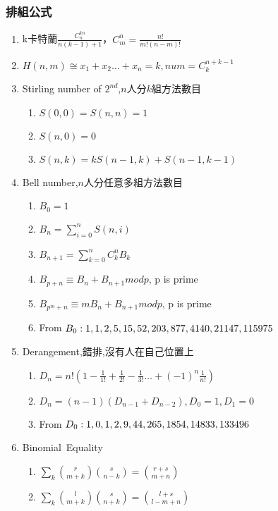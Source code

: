 \subsubsection{排組公式}
\begin{enumerate}
\itemsep = -3pt
\item k卡特蘭$\frac{C_{n}^{kn}}{n(k-1)+1}$，$C_{m}^{n}=\frac{n!}{m!(n-m)!}$
\item $H(n,m)\cong x_1+x_2\ldots +x_n=k, num=C_{k}^{n+k-1}$
\item Stirling number of $2^{nd}$,$n$人分$k$組方法數目
	\begin{enumerate}\itemsep = -2pt
		\item $S(0,0)=S(n,n)=1$
		\item $S(n,0)=0$
		\item $S(n,k)=kS(n-1,k)+S(n-1,k-1)$
	\end{enumerate}
\item Bell number,$n$人分任意多組方法數目
	\begin{enumerate}\itemsep = -2pt
		\item $B_0=1$
		\item $B_n=\sum_{i=0}^nS(n,i)$
		\item $B_{n+1}=\sum_{k=0}^{n} C_k^n B_k$
		\item $B_{p+n}\equiv B{_n}+B_{n+1} mod p$, p is prime
		\item $B_{p^m+n}\equiv mB{_n}+B_{n+1} mod p$, p is prime
		\item From $B_0: 1,1,2,5,15,52,\\203,877,4140,21147,115975$
	\end{enumerate}
\item Derangement,錯排,沒有人在自己位置上
	\begin{enumerate}\itemsep = -2pt
		\item $D_n=n!(1-\frac{1}{1!}+\frac{1}{2!}-\frac{1}{3!}\ldots +(-1)^n\frac{1}{n!})$
		\item $D_n=(n-1)(D_{n-1}+D_{n-2}),D_0=1,D_1=0$
		\item From $D_0: 1,0,1,2,9,44,\\265,1854,14833,133496$
	\end{enumerate}
\item Binomial\ Equality
	\begin{enumerate}\itemsep = -2pt
	    \item $\sum_k \binom{r}{m + k} \binom{s}{n - k} = \binom{r + s}{m + n}$
         \item $\sum_k \binom{l}{m + k} \binom{s}{n + k} = \binom{l + s}{l -m + n}$		

\end{enumerate}
\end{enumerate}
